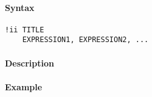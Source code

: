 


	\paragraph{Syntax}

\begin{verbatim}
!ii TITLE
    EXPRESSION1, EXPRESSION2, ...
\end{verbatim}

\paragraph{Description}

\paragraph{Example}


